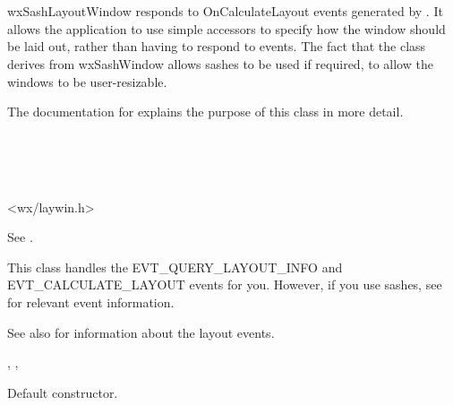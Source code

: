 \section{}\label{wxsashlayoutwindow}

wxSashLayoutWindow responds to OnCalculateLayout events generated
by . It allows the
application to use simple accessors to specify how the window should be
laid out, rather than having to respond to events. The fact that
the class derives from wxSashWindow allows sashes to be used if required,
to allow the windows to be user-resizable.

The documentation for  explains
the purpose of this class in more detail.


\\
\\
\\


<wx/laywin.h>


See .


This class handles the EVT\_QUERY\_LAYOUT\_INFO and EVT\_CALCULATE\_LAYOUT events
for you. However, if you use sashes, see  for
relevant event information.

See also  for information
about the layout events.


, , 


\label{wxsashlayoutwindowctor}


Default constructor.


